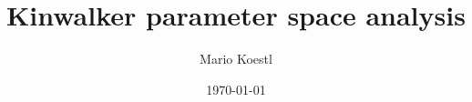 \documentclass{beamer}
\title[Kinwalker parameter space analysis]{Kinwalker parameter space analysis}
\author[Mario Koestl]{Mario Koestl}
\institute[TBI]{Institute for Theoretical Chemistry\\ University of Vienna}
\date{\today}
\begin{document}
\frame{
  \titlepage
}














\end{document}
